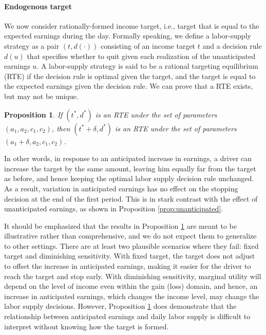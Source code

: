 \documentclass[reviewmode,AEJ]{AEA}
\newtheorem{proposition}{Proposition}
\begin{document}
\paragraph{Endogenous target} We now consider rationally-formed income target, i.e., target that is equal
to the expected earnings during the day. Formally speaking, we define a labor-supply strategy as a pair 
$(t, d(\cdot))$ consisting of an income target $t$ and a decision rule $d(u)$ that specifies whether to quit
given each realization of the unanticipated earnings $u$. A labor-supply strategy is said to be a rational
targeting equilibrium (RTE) if the decision rule  is optimal given the target, and the target is equal to
the expected earnings given the decision rule. We can prove that a RTE exists, but may not be unique. 
\begin{proposition}
\label{prop:anticipated}
If $(t^*, d^*)$ is an RTE under the set of parameters $(a_1, a_2, c_1, c_2)$, then $(t^*+\delta, d^*)$ is
an RTE under the set of parameters  $(a_1+\delta, a_2, c_1, c_2)$.
\end{proposition}


In other words, in response to an anticipated increase in earnings, a driver can increase the target by 
the same amount, leaving him equally far from the target as before, and hence keeping the optimal labor 
supply decision rule unchanged. As a result, variation in anticipated earnings has no effect on the stopping
decision at the end of the first period. This is in stark contrast with the effect of unanticipated earnings, 
as shown in Proposition \ref{prop:unanticipated}.

It should be emphasized that the results in Proposition \ref{prop:anticipated} are meant to be illustrative
rather than comprehensive, and we do not expect them to generalize to other settings. There are at least two 
plausible scenarios where they fail: fixed target and diminishing sensitivity. With fixed target, the target 
does not adjust to offset the increase in anticipated earnings, making it easier for the driver to reach the 
target and stop early. With diminishing sensitivity, marginal utility will depend on the level of income even
within the gain (loss) domain, and hence, an increase in anticipated earnings, which changes the income level,
may change the labor supply decisions. However, Proposition \ref{prop:anticipated} does demonstrate that the 
relationship between anticipated earnings and daily labor supply is difficult to interpret without knowing how
the target is formed. 
\end{document}

